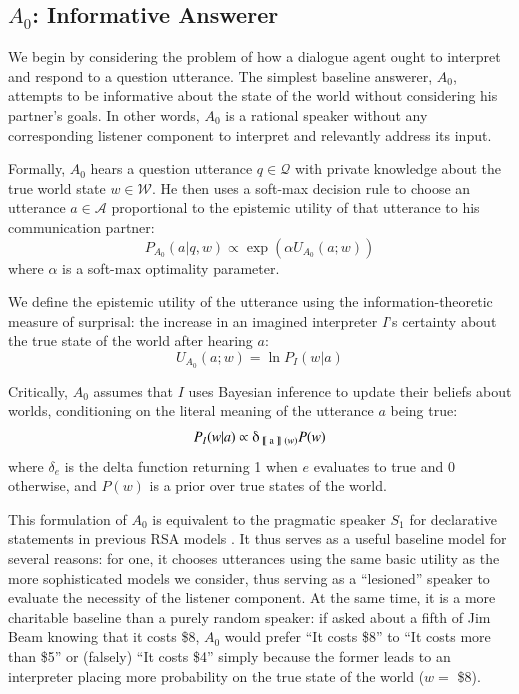 \documentclass[12pt, floatsintext, jou]{apa6}
\newcommand{\den}[2][]{
\(
\left\llbracket\;\text{#2}\;\right\rrbracket^{#1}
\)
}
\newcommand{\ndg}[1]{\textcolor{Green}{[ndg: #1]}}
\begin{document}

\subsection{$A_0$: Informative Answerer}

We begin by considering the problem of how a dialogue agent ought to interpret and respond to a question utterance. The simplest baseline answerer, $A_0$, attempts to be informative about the state of the world without considering his partner's goals. In other words, $A_0$ is a rational speaker without any corresponding listener component to interpret and relevantly address its input. 

Formally, $A_0$ hears a question utterance $q \in \mathcal{Q}$ with private knowledge about the true world state $w \in \mathcal{W}$. He then uses a soft-max decision rule to choose an utterance $a \in \mathcal{A}$ proportional to the epistemic utility of that utterance to his communication partner: 
$$P_{A_0}(a | q, w) \propto \exp(\alpha U_{A_0}(a;w))$$ 
where $\alpha$ is a soft-max optimality parameter. 

We define the epistemic utility of the utterance using the information-theoretic measure of surprisal: the increase in an imagined interpreter $I$'s certainty about the true state of the world after hearing $a$: 
\begin{equation}
\label{eq:A0utility}
U_{A_0}(a;w) = \ln P_I(w|a)
\end{equation}

Critically, $A_0$ assumes that $I$ uses Bayesian inference to update their beliefs about worlds, conditioning on the literal meaning of the utterance $a$ being true:
$$P_I(w|a) \propto \delta_{\textrm{\den{a}}(w)} P(w)$$
where $\delta_{e}$ is the delta function returning 1 when $e$ evaluates to true and 0 otherwise, and $P(w)$ is a prior over true states of the world. 

This formulation of $A_0$ is equivalent to the pragmatic speaker $S_1$ for declarative statements in previous RSA models \cite{GoodmanFrank16_RSATiCS}. It thus serves as a useful baseline model for several reasons: for one, it chooses utterances using the same basic utility as the more sophisticated models we consider, thus serving as a ``lesioned'' speaker to evaluate the necessity of the listener component. At the same time, it is a more charitable baseline than a purely random speaker: if asked about a fifth of Jim Beam knowing that it costs \$8, $A_0$ would prefer ``It costs \$8'' to ``It costs more than \$5'' or (falsely) ``It costs \$4'' simply because the former leads to an interpreter placing more probability on the true state of the world ($w = $ \$8).
\end{document}
